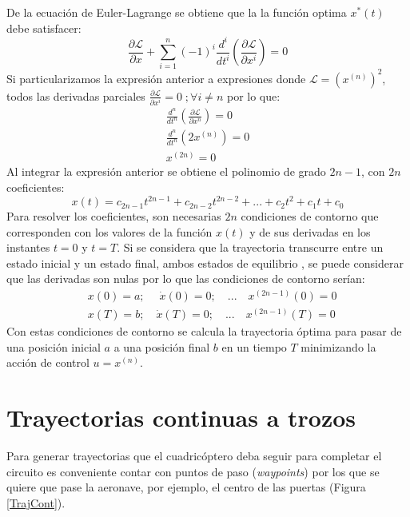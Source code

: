 De la  ecuación de Euler-Lagrange se obtiene que la la función optima $x^*(t)$ debe satisfacer:
\begin{equation}
	\frac{\partial\mathcal{L}}{\partial x} + \sum_{i=1}^{n}(-1)^i \frac{d^i}{dt^i}\left(\frac{\partial\mathcal{L}}{\partial x^i}\right)  = 0
\end{equation}
Si particularizamos la expresión anterior a expresiones donde $\mathcal{L} =\left(x^{(n)}\right)^2$, todos las derivadas parciales $\frac{\partial\mathcal{L}}{\partial x^i} = 0 \; ; \forall i \neq n$ por lo que:
\begin{align}
	\frac{d^n}{dt^n}\left(\frac{\partial\mathcal{L}}{\partial x^n}\right) = 0 \\
	\frac{d^n}{dt^n}\left(2 x^{(n)}\right) = 0\\
	x^{(2n)} = 0
\end{align}
Al integrar la expresión anterior se obtiene el polinomio de grado $2n-1$, con $2n$ coeficientes:
\begin{equation}
	x(t) = c_{2n-1}t^{2n-1} + c_{2n-2}t^{2n-2} + ... + c_2t^2 + c_1t + c_0
\end{equation}
Para resolver los coeficientes, son necesarias $2n$ condiciones de contorno que corresponden con los valores de la función $x(t)$ y de sus derivadas en los instantes $t=0$ y $t = T$. Si se considera que la trayectoria transcurre entre un estado inicial y un estado final, ambos estados de equilibrio , se puede considerar que las derivadas son nulas por lo que las condiciones de contorno serían:
\begin{align}
 	&x(0) = a; \quad \;\dot{x}(0) = 0;  \quad...\quad x^{(2n-1)}(0) = 0\\
	&x(T) = b;\quad \dot{x}(T) = 0;  \quad...\quad x^{(2n-1)}(T) = 0
\end{align}
Con estas condiciones de contorno se calcula la trayectoria óptima para pasar de una posición inicial $a$ a una posición final $b$ en un tiempo $T$ minimizando la acción de control $u = x^{(n)}$. 



\section{Trayectorias continuas a trozos}
Para generar trayectorias que el cuadricóptero deba seguir para completar el circuito es conveniente contar con puntos de paso (\textit{waypoints}) por los que se quiere que pase la aeronave, por ejemplo, el centro de las puertas (Figura \ref{TrajCont}).


